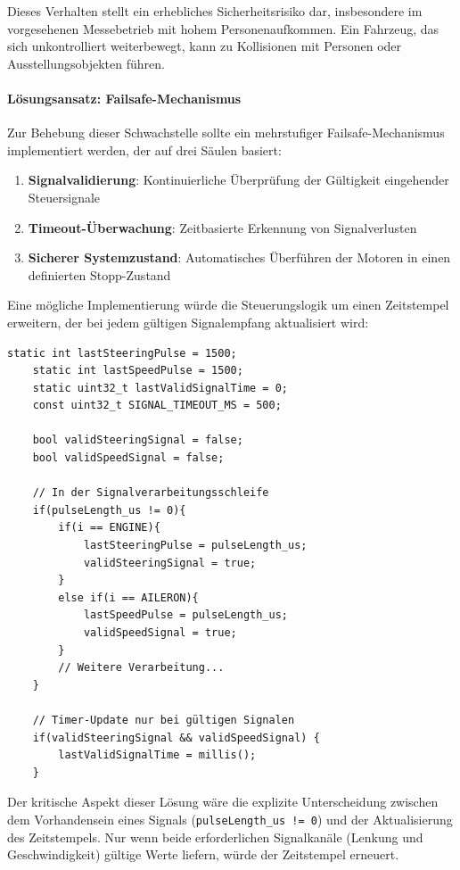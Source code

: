 Dieses Verhalten stellt ein erhebliches Sicherheitsrisiko dar, insbesondere im vorgesehenen Messebetrieb mit hohem Personenaufkommen. Ein Fahrzeug, das sich unkontrolliert weiterbewegt, kann zu Kollisionen mit Personen oder Ausstellungsobjekten führen.

\paragraph{Lösungsansatz: Failsafe-Mechanismus}
Zur Behebung dieser Schwachstelle sollte ein mehrstufiger Failsafe-Mechanismus implementiert werden, der auf drei Säulen basiert:

\begin{enumerate}
	\item \textbf{Signalvalidierung}: Kontinuierliche Überprüfung der Gültigkeit eingehender Steuersignale
	\item \textbf{Timeout-Überwachung}: Zeitbasierte Erkennung von Signalverlusten
	\item \textbf{Sicherer Systemzustand}: Automatisches Überführen der Motoren in einen definierten Stopp-Zustand
\end{enumerate}

Eine mögliche Implementierung würde die Steuerungslogik um einen Zeitstempel erweitern, der bei jedem gültigen Signalempfang aktualisiert wird:

\begin{lstlisting}[style=motorStyle, caption={Vorschlag für erweiterte Signalverarbeitung mit Gültigkeitsprüfung}]
	static int lastSteeringPulse = 1500;
	static int lastSpeedPulse = 1500;
	static uint32_t lastValidSignalTime = 0;
	const uint32_t SIGNAL_TIMEOUT_MS = 500;
	
	bool validSteeringSignal = false;
	bool validSpeedSignal = false;
	
	// In der Signalverarbeitungsschleife
	if(pulseLength_us != 0){ 
		if(i == ENGINE){
			lastSteeringPulse = pulseLength_us;
			validSteeringSignal = true;
		}
		else if(i == AILERON){
			lastSpeedPulse = pulseLength_us;
			validSpeedSignal = true;
		}
		// Weitere Verarbeitung...
	}
	
	// Timer-Update nur bei gültigen Signalen
	if(validSteeringSignal && validSpeedSignal) {
		lastValidSignalTime = millis();
	}
\end{lstlisting}

Der kritische Aspekt dieser Lösung wäre die explizite Unterscheidung zwischen dem Vorhandensein eines Signals (\texttt{pulseLength\_us != 0}) und der Aktualisierung des Zeitstempels. Nur wenn beide erforderlichen Signalkanäle (Lenkung und Geschwindigkeit) gültige Werte liefern, würde der Zeitstempel erneuert.

